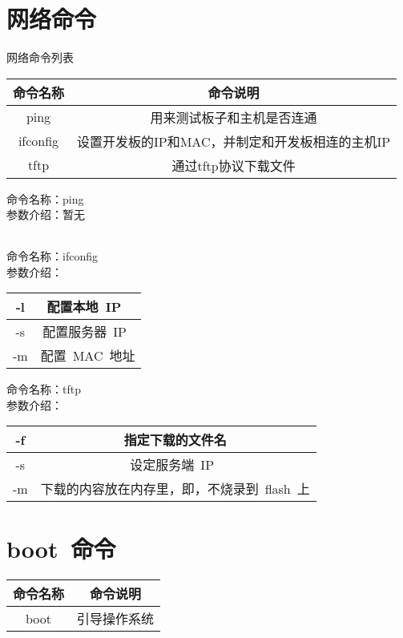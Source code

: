 \section{网络命令}

\noindent 网络命令列表
\begin{table}[htbp]
\setlength{\parindent}{0pt}
\begin{tabular}{|c|c|}
\hline
\small 命令名称 & \small 命令说明 \\
\hline
 ping & 用来测试板子和主机是否连通 \\
\hline
  ifconfig & 设置开发板的IP和MAC，并制定和开发板相连的主机IP \\
\hline
  tftp & 通过tftp协议下载文件 \\
\hline
\end{tabular}
\end{table}

\noindent 命令名称：ping\\
参数介绍：暂无
\begin{table}[htbp]
\setlength{\parindent}{0pt}
\begin{tabular}{|c|c|}
\end{tabular}
\end{table}
\pagebreak[4]

\noindent 命令名称：ifconfig\\
参数介绍：
\begin{table}[htbp]
\setlength{\parindent}{0pt}
\begin{tabular}{|c|c|}
\hline
 -l &   配置本地~IP~ \\
\hline
 -s &   配置服务器~IP~ \\
\hline
  -m&   配置~MAC~地址 \\
\hline
\end{tabular}
\end{table}

\noindent 命令名称：tftp\\
参数介绍：
\begin{table}[htbp]
\setlength{\parindent}{0pt}
\begin{tabular}{|c|c|}
\hline
 -f &   指定下载的文件名 \\
\hline
 -s &   设定服务端~IP~ \\
\hline
 -m &   下载的内容放在内存里，即，不烧录到~flash~上 \\
\hline
\end{tabular}
\end{table}
\pagebreak[4]

\section{boot~命令}
\begin{table}[htbp]
\setlength{\parindent}{0pt}
\begin{tabular}{|c|c|}
\hline
 命令名称 & 命令说明\\
\hline
~boot~ & 引导操作系统\\
\hline
\end{tabular}
\end{table}

